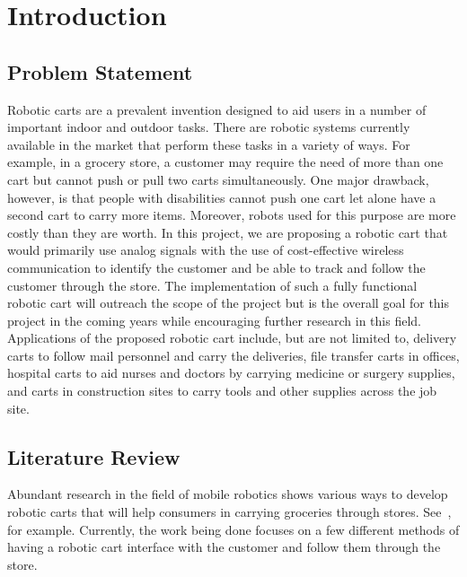 \chapter{Introduction}
\label{ch: Chapter1}

\section{Problem Statement}
Robotic carts are a prevalent invention designed to aid users in a number of important indoor and outdoor tasks. There are robotic systems currently available in the market that perform these tasks in a variety of ways. For example, in a grocery store, a customer may require the need of more than one cart but cannot push or pull two carts simultaneously. One major drawback, however, is that people with disabilities cannot push one cart let alone have a second cart to carry more items. Moreover, robots used for this purpose are more costly than they are worth. In this project, we are proposing a robotic cart that would primarily use analog signals with the use of cost-effective wireless communication to identify the customer and be able to track and follow the customer through the store. The implementation of such a fully functional robotic cart will outreach the scope of the project but is the overall goal for this project in the coming years while encouraging further research in this field. Applications of the proposed robotic cart include, but are not limited to, delivery carts to follow mail personnel and carry the deliveries, file transfer carts in offices, hospital carts to aid nurses and doctors by carrying medicine or surgery supplies, and carts in construction sites to carry tools and other supplies across the job site.



\section{Literature Review}
Abundant research in the field of mobile robotics shows various ways to develop robotic carts that will help consumers in carrying groceries through stores. See~\cite{Rawashdeh2017-Person,islam_lam_fukuda_kobayashi_kuno_2019,Sales2016-CompaRob}, for example. Currently, the work being done focuses on a few different methods of having a robotic cart interface with the customer and follow them through the store.

